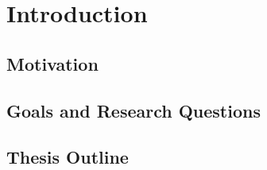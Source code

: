 \documentclass[english, BCOR=6mm, twoside=true, open=right]{tudscrreprt}
\begin{document}

\maketitle




\confirmation[pagestyle=empty.tudheadings]
\cleardoublepage


\begin{abstract}[pagestyle=empty.tudheadings]

\end{abstract}

\tableofcontents

\chapter{Introduction}

\section{Motivation}

\section{Goals and Research Questions}

\section{Thesis Outline}



% 
% 
% 


\end{document}
